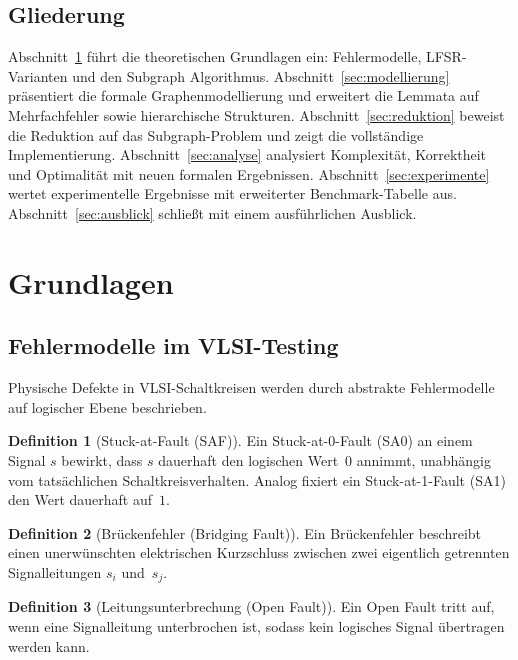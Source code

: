 ﻿\documentclass[a4paper,12pt]{article}
\theoremstyle{definition}
\newtheorem{definition}{Definition}
\begin{document}
\subsection{Gliederung}

Abschnitt~\ref{sec:grundlagen} führt die theoretischen Grundlagen ein:
Fehlermodelle, LFSR-Varianten und den Subgraph Algorithmus.
Abschnitt~\ref{sec:modellierung} präsentiert die formale Graphenmodellierung
und erweitert die Lemmata auf Mehrfachfehler sowie hierarchische Strukturen.
Abschnitt~\ref{sec:reduktion} beweist die Reduktion auf das Subgraph-Problem
und zeigt die vollständige Implementierung.
Abschnitt~\ref{sec:analyse} analysiert Komplexität, Korrektheit und
Optimalität mit neuen formalen Ergebnissen.
Abschnitt~\ref{sec:experimente} wertet experimentelle Ergebnisse mit
erweiterter Benchmark-Tabelle aus.
Abschnitt~\ref{sec:ausblick} schließt mit einem ausführlichen Ausblick.

\section{Grundlagen}
\label{sec:grundlagen}

\subsection{Fehlermodelle im VLSI-Testing}

Physische Defekte in VLSI-Schaltkreisen werden durch abstrakte Fehlermodelle
auf logischer Ebene beschrieben.

\begin{definition}[Stuck-at-Fault (SAF)]
  Ein Stuck-at-0-Fault (SA0) an einem Signal $s$ bewirkt, dass $s$ dauerhaft
  den logischen Wert~$0$ annimmt, unabhängig vom tatsächlichen
  Schaltkreis\-verhalten. Analog fixiert ein Stuck-at-1-Fault (SA1) den Wert
  dauerhaft auf~$1$.
\end{definition}

\begin{definition}[Brückenfehler (Bridging Fault)]
  Ein Brückenfehler beschreibt einen unerwünschten elektrischen Kurzschluss
  zwischen zwei eigentlich getrennten Signalleitungen $s_i$ und~$s_j$.
\end{definition}

\begin{definition}[Leitungsunterbrechung (Open Fault)]
  Ein Open Fault tritt auf, wenn eine Signalleitung unterbrochen ist, sodass
  kein logisches Signal übertragen werden kann.
\end{definition}
\end{document}
